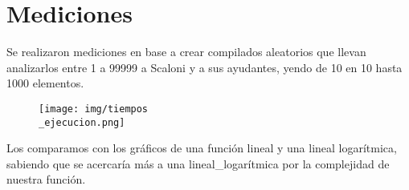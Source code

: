 \section{Mediciones}

Se realizaron mediciones en base a crear compilados aleatorios que llevan analizarlos entre 1 a 
99999 a Scaloni y a sus ayudantes, yendo de 10 en 10 hasta 1000 elementos.

\begin{figure}[H]
    \centering
    \texttt{[image: img/tiempos\\\_ejecucion.png]}
\end{figure}

Los comparamos con los gráficos de una función lineal y una lineal logarítmica, sabiendo que 
se acercaría más a una lineal\_logarítmica por la complejidad de nuestra función.